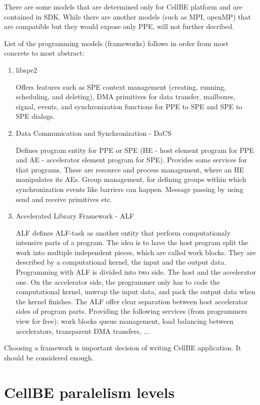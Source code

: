 There are some models that are determined only for CellBE platform and are contained in SDK.
 While there are another models (such as MPI, openMP) that are compatible but they would expose only PPE, will not further decribed.

List of the programming models (frameworks) follows in order from most concrete to most abstract:
\begin{enumerate}
\item {libspe2}
\par
Offers features such as SPE context management (creating, running, scheduling, and deleting), DMA primitives for data transfer, mailboxes, signal, events, and synchronization functions for PPE to SPE and SPE to SPE dialogs. 

\item {Data Communication and Synchronization - DaCS}
\par
Defines program entity for PPE or SPE (HE - host element program for PPE and AE - accelerator element program for SPE).
Provides some services for that programs.
These are resource and process management, where an HE manipulates its AEs.
Group management, for defining groups within which synchronization events like barriers can happen.
Message passing by using send and receive primitives etc.

\item {Accelerated Library Framework - ALF}
\par
ALF defines ALF-task as another entity that perform computationaly intensive parts of a program.
The idea is to have the host program split the work into multiple independent pieces, which are called work blocks.
They are described by a computational kernel, the input and the output data. Programming with ALF is divided into two side.
The host and the accelerator one.
On the accelerator side, the programmer only has to code the computational kernel, unwrap the input data, and pack the output data when the kernel finishes.
The ALF offer clear separation between host accelerator sides of program parts.
Providing the following services (from programmers view for free): work blocks queue management, load balancing between accelerators, transparent DMA transfers, ...

\end{enumerate}

Choosing a framework is important decision of writing CellBE application.
 It should be considered enough.

\section {CellBE paralelism levels}

